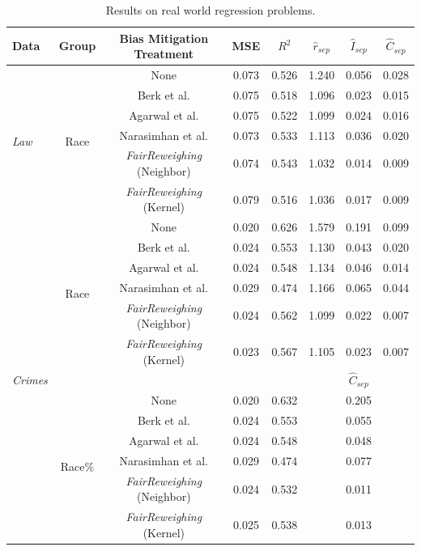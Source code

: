 \begin{table}[ht]
\small
  \setlength\tabcolsep{6pt}
    \setlength\extrarowheight{1pt}
  \caption{Results on real world regression problems.}
  \label{tab:binary}
  \centering
  \begin{tabular}{l|c|c|c|c|c|c|c}
  \hline Data & Group & {Bias Mitigation Treatment} & MSE & $R^2$ & $\hat{r}_{sep}$ & $\hat{I}_{sep}$ & $\hat{C}_{sep}$\\ \hline  

    \multirow{6}{*}{\emph{Law}} & \multirow{6}{*}{Race} & {None} &  0.073 &0.526 &1.240 &0.056&0.028\\   
  & & {Berk et al.} & 0.075 &0.518&1.096&0.023&0.015\\ 
  & & {Agarwal et al.} &  0.075&0.522&1.099&0.024&0.016 \\ 
  & & {Narasimhan et al.} &  0.073&0.533&1.113&0.036&0.020\\   
  & & {\emph{FairReweighing} (Neighbor)} &  0.074&0.543&1.032 &0.014&0.009 \\   
  & & {\emph{FairReweighing} (Kernel)} &  0.079&0.516&1.036 &0.017&0.009 \\ \hline
  \multirow{13}{*}{\emph{Crimes}} & \multirow{6}{*}{Race} & {None} & 0.020 & 0.626 & 1.579 & 0.191& 0.099  \\   
  & & {Berk et al.} & 0.024 & 0.553 & 1.130 & 0.043 & 0.020 \\ 
  & & {Agarwal et al.} &  0.024 & 0.548 & 1.134 & 0.046 & 0.014  \\ 
  & & {Narasimhan et al.} &  0.029&0.474&1.166 & 0.065 & 0.044 \\   
  & & {\emph{FairReweighing} (Neighbor)} &  0.024&0.562&1.099 & 0.022& 0.007 \\   
  & & {\emph{FairReweighing} (Kernel)} &  0.023&0.567&1.105 & 0.023& 0.007 \\ \cline{2-8}
 &\multicolumn{4}{c|}{}& \multicolumn{3}{c}{$\hat{C}_{sep}$}\\ \cline{2-8}

   & \multirow{6}{*}{Race\%} & {None} & 0.020 & 0.632 & \multicolumn{3}{c}{0.205} \\   
  & & {Berk et al.} & 0.024 & 0.553 & \multicolumn{3}{c}{0.055} \\ 
  & & {Agarwal et al.} &  0.024 & 0.548 & \multicolumn{3}{c}{0.048} \\ 
  & & {Narasimhan et al.} &  0.029&0.474&\multicolumn{3}{c}{0.077} \\   
  & & {\emph{FairReweighing} (Neighbor)} &  0.024&0.532&\multicolumn{3}{c}{0.011} \\   
  & & {\emph{FairReweighing} (Kernel)} &  0.025&0.538&\multicolumn{3}{c}{0.013} \\ \hline  
  \end{tabular}
\end{table}

